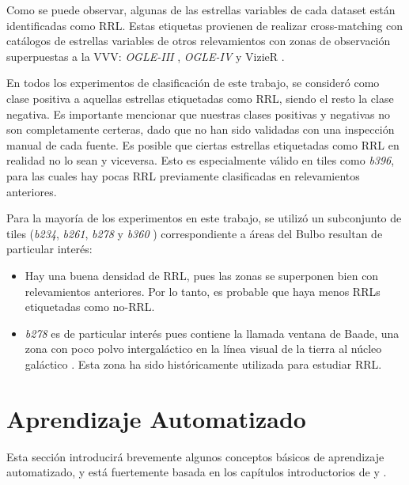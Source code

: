 \par Como se puede observar, algunas de las estrellas variables de cada dataset están identificadas como RRL. Estas etiquetas provienen de realizar cross-matching con catálogos de estrellas variables de otros relevamientos con zonas de observación superpuestas a la VVV: \textit{OGLE-III} \cite{Udalski}, \textit{OGLE-IV} \cite{Udalski2} y VizieR \cite{vizier}. \\

\par En todos los experimentos de clasificación de este trabajo, se consideró como clase positiva a aquellas estrellas etiquetadas como RRL, siendo el resto la clase negativa. Es importante mencionar que nuestras clases positivas y negativas no son completamente certeras, dado que no han sido validadas con una inspección manual de cada fuente. Es posible que ciertas estrellas etiquetadas como RRL en realidad no lo sean y viceversa. Esto es especialmente válido en tiles como \textit{b396}, para las cuales hay pocas RRL previamente clasificadas en relevamientos anteriores. \\

\par Para la mayoría de los experimentos en este trabajo, se utilizó un subconjunto de tiles (\textit{b234}, \textit{b261}, \textit{b278} y \textit{b360} ) correspondiente a áreas del Bulbo resultan de particular interés:

\begin{itemize}
\item Hay una buena densidad de RRL, pues las zonas se superponen bien con relevamientos anteriores. Por lo tanto, es probable que haya menos RRLs etiquetadas como no-RRL.

\item \textit{b278} es de particular interés pues contiene la llamada ventana de Baade, una zona con poco polvo intergaláctico en la línea visual de la tierra al núcleo galáctico \cite{Baade}. Esta zona ha sido históricamente utilizada para estudiar RRL.

\end{itemize}

\section {Aprendizaje Automatizado}

Esta sección introducirá brevemente algunos conceptos básicos de aprendizaje automatizado, y está fuertemente basada en los capítulos introductorios de \cite{mitchell} y \cite{slearning}.

